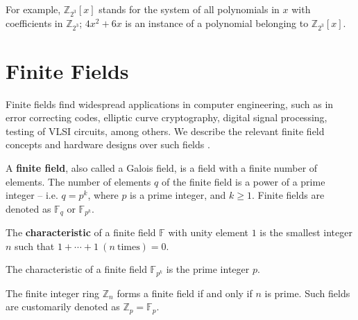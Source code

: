 For example, $\mathbb{Z}_{2^3}[x]$ stands for the system of all polynomials in
$x$ with coefficients in $\mathbb{Z}_{2^3}$; $4x^2 + 6x$ is an instance of
a polynomial belonging to $\mathbb{Z}_{2^3}[x]$.

\section{Finite Fields}\label{sec:ff}
Finite fields find widespread applications in computer engineering, such as in error correcting codes, elliptic curve cryptography, digital signal
processing, testing of VLSI circuits, among others. 
We describe the relevant finite field concepts \cite{galois_field:mceliece} \cite{ftheory:2006} \cite{ff:1997}
and hardware designs over such fields \cite{mastro:1989} \cite{PT:1985} \cite{acar:1998} \cite{wu:2002} \cite{Knezevic:2008}. 


\begin{Definition} 
A {\bf finite field}, also called a Galois field, is a field with a finite
number of elements. The number of elements $q$ of the finite field is
a power of a prime integer -- i.e. $q = p^k$, where $p$ is a prime
integer, and $k \geq 1$. Finite fields are denoted as $\mathbb{F}_{q}$ or $\mathbb{F}_{p^{k}}$.
\end{Definition}


\begin{Definition}
The {\bf characteristic} of a finite field $\mathbb{F}$ with unity element $1$ is the smallest integer $n$ 
such that $1+\cdots+1 ~(n ~\text{times})=0$.  
\end{Definition}

\begin{Lemma}
	The characteristic of a finite field $\mathbb{F}_{p^{k}}$ is the prime integer $p$.
\end{Lemma}

\begin{Lemma}
The finite integer ring $\mathbb{Z}_n$ forms a finite field if and only if $n$ is prime. 
Such fields are customarily denoted as $\mathbb{Z}_p=\mathbb{F}_p$. 
\end{Lemma}


